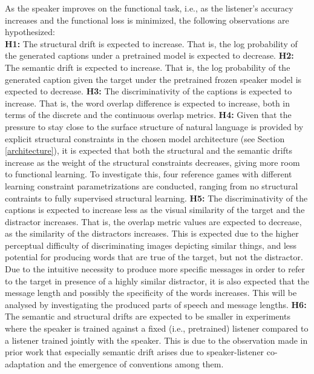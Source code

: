 As the speaker improves on the functional task, i.e., as the listener's accuracy increases and the functional loss is minimized, the following observations are hypothesized: \\
\newline 
\textbf{H1:} The structural drift is expected to increase. That is, the log probability of the generated captions under a pretrained model is expected to decrease. \newline
\textbf{H2:} The semantic drift is expected to increase. That is, the log probability of the generated caption given the target under the pretrained frozen speaker model is expected to decrease. \newline
\textbf{H3:} The discriminativity of the captions is expected to increase. That is, the word overlap difference is expected to increase, both in terms of the discrete and the continuous overlap metrics. \newline
\textbf{H4:} Given that the pressure to stay close to the surface structure of natural language is provided by explicit structural constraints in the chosen model architecture (see Section \ref{architecture}), it is expected that both the structural and the semantic drifts increase as the weight of the structural constraints decreases, giving more room to functional learning. To investigate this, four reference games with different learning constraint parametrizations are conducted, ranging from no structural contraints to fully supervised structural learning. \newline
\textbf{H5:} The discriminativity of the captions is expected to increase less as the visual similarity of the target and the distractor increases. That is, the overlap metric values are expected to decrease, as the similarity of the distractors increases. This is expected due to the higher perceptual difficulty of discriminating images depicting similar things, and less potential for producing words that are true of the target, but not the distractor. Due to the intuitive necessity to produce more specific messages in order to refer to the target in presence of a highly similar distractor, it is also expected that the message length and possibly the specificity of the words increases. This will be analysed by investigating the produced parts of speech and message lengths.\newline
\textbf{H6:}  The semantic and structural drifts are expected to be smaller in experiments where the speaker is trained against a fixed (i.e., pretrained) listener compared to a listener trained jointly with the speaker. This is due to the observation made in prior work that especially semantic drift arises due to speaker-listener co-adaptation and the emergence of conventions among them. \newline

